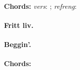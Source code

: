 \documentclass[%
twoside,                 %
draft,                   %
final,                   %
10pt]{article}
\begin{document}
\textbf{Chords:} \emph{vers}: ; \emph{refreng}: 





\paragraph{Fritt liv.}





\paragraph{Beggin'.}
\textbf{Chords:} 






\printindex
\end{document}
